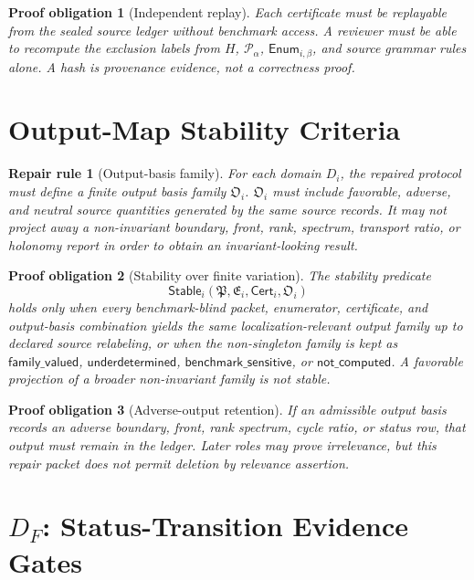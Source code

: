 \documentclass[11pt]{article}
\newcommand{\Pack}{\mathcal{P}}
\newcommand{\PackFam}{\mathfrak{P}}
\newcommand{\Enum}{\mathsf{Enum}}
\newcommand{\EnumFam}{\mathfrak{E}}
\newcommand{\Cert}{\mathsf{Cert}}
\newcommand{\OutFam}{\mathfrak{O}}
\newcommand{\Stable}{\mathsf{Stable}}
\newtheorem{repairrule}{Repair rule}
\newtheorem{obligation}{Proof obligation}
\begin{document}
\begin{obligation}[Independent replay]
Each certificate must be replayable from the sealed source ledger without
benchmark access. A reviewer must be able to recompute the exclusion labels
from \(H\), \(\Pack_\alpha\), \(\Enum_{i,\beta}\), and source grammar rules
alone. A hash is provenance evidence, not a correctness proof.
\end{obligation}

\section{Output-Map Stability Criteria}

\begin{repairrule}[Output-basis family]
For each domain \(D_i\), the repaired protocol must define a finite output
basis family \(\OutFam_i\). \(\OutFam_i\) must include favorable, adverse,
and neutral source quantities generated by the same source records. It may
not project away a non-invariant boundary, front, rank, spectrum, transport
ratio, or holonomy report in order to obtain an invariant-looking result.
\end{repairrule}

\begin{obligation}[Stability over finite variation]
The stability predicate
\[
\Stable_i(\PackFam,\EnumFam_i,\Cert_i,\OutFam_i)
\]
holds only when every benchmark-blind packet, enumerator, certificate, and
output-basis combination yields the same localization-relevant output family
up to declared source relabeling, or when the non-singleton family is kept as
\(\mathsf{family\_valued}\), \(\mathsf{underdetermined}\),
\(\mathsf{benchmark\_sensitive}\), or \(\mathsf{not\_computed}\). A favorable
projection of a broader non-invariant family is not stable.
\end{obligation}

\begin{obligation}[Adverse-output retention]
If an admissible output basis records an adverse boundary, front, rank
spectrum, cycle ratio, or status row, that output must remain in the ledger.
Later roles may prove irrelevance, but this repair packet does not permit
deletion by relevance assertion.
\end{obligation}

\section{\texorpdfstring{\(D_F\)}{DF}: Status-Transition Evidence Gates}
\end{document}
